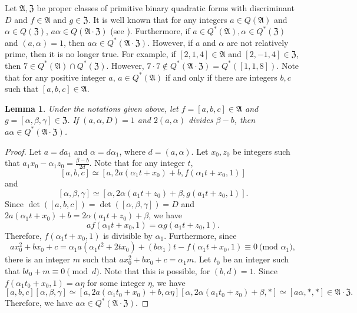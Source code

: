 \documentclass{amsart}
\newtheorem{lem}[thm]{Lemma}
\theoremstyle{definition}
\theoremstyle{remark}
\numberwithin{equation}{section}
\begin{document}
Let $\mathfrak A, \mathfrak Z$ be proper classes of primitive binary quadratic forms with discriminant $D$ and $f \in \mathfrak A$ and $g \in \mathfrak Z$.
 It is well known that for any integers $a \in Q(\mathfrak A)$ and $\alpha \in  Q(\mathfrak Z)$, $a\alpha \in Q(\mathfrak A\cdot\mathfrak Z)$ (see \cite{ef}).  Furthermore, if  $a \in Q^*(\mathfrak A), \alpha \in  Q^*(\mathfrak Z)$ and $(a,\alpha)=1$, then $a\alpha \in Q^*(\mathfrak A\cdot\mathfrak Z)$.
However, if $a$ and $\alpha$ are not relatively prime, then it is no longer true. For  example,  if $[2,1,4] \in  \mathfrak A$ and $[2,-1,4] \in \mathfrak Z$, then  $7 \in Q^*(\mathfrak A) \cap Q^*(\mathfrak Z)$. However,  $7\!\cdot \!7 \not \in Q^*(\mathfrak A\cdot\mathfrak Z)=Q^*([1,1,8])$. Note that  for any positive integer $a$, $a \in Q^*(\mathfrak A)$ if and only if there are integers $b,c$ such that $[a,b,c] \in \mathfrak A$.  
 
   
\begin{lem} \label{keyl} Under the notations given above, let $f=[a,b,c] \in \mathfrak A$ and $g=[\alpha,\beta,\gamma] \in \mathfrak Z$. If $(a,\alpha,D)=1$ and $2(a,\alpha)$ divides $\beta-b$, then 
$a\alpha \in Q^*(\mathfrak A\cdot\mathfrak Z)$. 
\end{lem}

\begin{proof}  Let $a=da_1$ and $\alpha=d\alpha_1$, where $d=(a,\alpha)$.   Let $x_0, z_0$ be integers such that $a_1x_0-\alpha_1z_0=\frac {\beta-b}{2d}$. Note that for any integer $t$,
$$
[a,b,c] \simeq [a,2a(\alpha_1t+x_0)+b,f(\alpha_1t+x_0,1)]
$$
and 
$$
[\alpha,\beta,\gamma] \simeq [\alpha,2\alpha(a_1t+z_0)+\beta,g(a_1t+z_0,1)].
$$
Since $\det([a,b,c])=\det([\alpha,\beta,\gamma])=D$ and $2a(\alpha_1t+x_0)+b=2\alpha(a_1t+z_0)+\beta$, we have 
$$
af(\alpha_1t+x_0,1)=\alpha g(a_1t+z_0,1).
$$
 Therefore, $f(\alpha_1t+x_0,1)$ is divisible by $\alpha_1$. Furthermore, since
$$
ax_0^2+bx_0+c=\alpha_1a(\alpha_1 t^2+2tx_0)+(b\alpha_1)t-f(\alpha_1t+x_0,1)\equiv 0 \ \text{(mod $\alpha_1$)},
$$
 there is an integer $m$ such that $ax_0^2+bx_0+c=\alpha_1m$. Let $t_0$ be an integer such that $bt_0+m \equiv 0 \pmod d$. Note that this is possible, for $(b,d)=1$.  Since $f(\alpha_1t_0+x_0,1)=\alpha\eta$ for some integer $\eta$, we have
$$
[a,b,c][\alpha,\beta,\gamma] \simeq [a,2a(\alpha_1t_0+x_0)+b,\alpha\eta][\alpha,2\alpha(a_1t_0+z_0)+\beta,*] \simeq [a\alpha,*,*] \in \mathfrak A \cdot \mathfrak Z.
$$
Therefore, we have $a\alpha \in Q^*(\mathfrak A\cdot \mathfrak Z)$.  
\end{proof}
\end{document}
